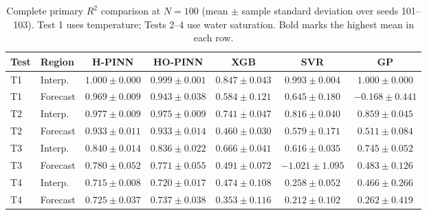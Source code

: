 \begin{table}[t]
\centering
\scriptsize
\setlength{\tabcolsep}{3.2pt}
\caption{Complete primary $R^2$ comparison at $N=100$ (mean $\pm$ sample standard deviation over seeds 101--103). Test 1 uses temperature; Tests 2--4 use water saturation. Bold marks the highest mean in each row.}
\label{tab:primary_full_n100}
\begin{tabular}{@{}llccccc@{}}
\toprule
Test & Region & H-PINN & HO-PINN & XGB & SVR & GP \\
\midrule
T1 & Interp. & \textbf{$1.000\pm0.000$} & $0.999\pm0.001$ & $0.847\pm0.043$ & $0.993\pm0.004$ & \textbf{$1.000\pm0.000$} \\
T1 & Forecast & \textbf{$0.969\pm0.009$} & $0.943\pm0.038$ & $0.584\pm0.121$ & $0.645\pm0.180$ & $-0.168\pm0.441$ \\
\addlinespace[1pt]
T2 & Interp. & \textbf{$0.977\pm0.009$} & $0.975\pm0.009$ & $0.741\pm0.047$ & $0.816\pm0.040$ & $0.859\pm0.045$ \\
T2 & Forecast & $0.933\pm0.011$ & \textbf{$0.933\pm0.014$} & $0.460\pm0.030$ & $0.579\pm0.171$ & $0.511\pm0.084$ \\
\addlinespace[1pt]
T3 & Interp. & \textbf{$0.840\pm0.014$} & $0.836\pm0.022$ & $0.666\pm0.041$ & $0.616\pm0.035$ & $0.745\pm0.052$ \\
T3 & Forecast & \textbf{$0.780\pm0.052$} & $0.771\pm0.055$ & $0.491\pm0.072$ & $-1.021\pm1.095$ & $0.483\pm0.126$ \\
\addlinespace[1pt]
T4 & Interp. & $0.715\pm0.008$ & \textbf{$0.720\pm0.017$} & $0.474\pm0.108$ & $0.258\pm0.052$ & $0.466\pm0.266$ \\
T4 & Forecast & $0.725\pm0.037$ & \textbf{$0.737\pm0.038$} & $0.353\pm0.116$ & $0.212\pm0.102$ & $0.262\pm0.419$ \\
\bottomrule
\end{tabular}
\end{table}
